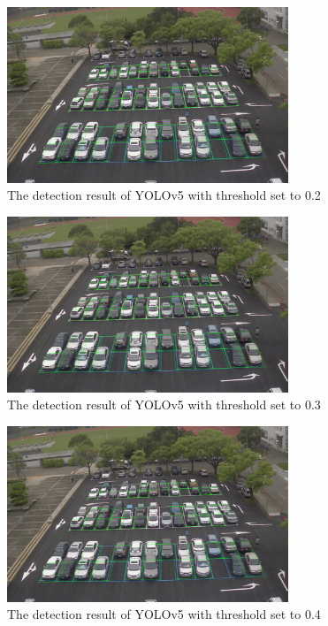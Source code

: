 \documentclass{article}[12pt]
\begin{document}
\begin{figure}[H]
    \centering
    \includegraphics[width=0.75\textwidth]{figure/Yolov5_first_frame_2.png}
    \caption{The detection result of YOLOv5 with threshold set to 0.2}
\end{figure}

\begin{figure}[H]
    \centering
    \includegraphics[width=0.75\textwidth]{figure/Yolov5_first_frame_3.png}
    \caption{The detection result of YOLOv5 with threshold set to 0.3}
\end{figure}


\begin{figure}[H]
    \centering
    \includegraphics[width=0.75\textwidth]{figure/Yolov5_first_frame_4.png}
    \caption{The detection result of YOLOv5 with threshold set to 0.4}
\end{figure}
\end{document}
